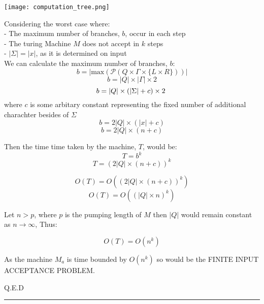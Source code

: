 \documentclass[a4page]{exam}
\begin{document}
\begin{questions}
\begin{solution}
    \texttt{[image: computation\_tree.png]}


    Considering the worst case where:\\
    - The maximum number of branches, $b$, occur in each step\\
    - The turing Machine $M$ does not accept in $k$ steps\\
    - $|\Sigma | = |x|$, as it is determined on input\\

    We can calculate the maximum number of branches, $b$:
    $$ b = |\text{max} \left( \mathcal{P}(Q \times \Gamma \times \{L\times R\}) \right) | $$
    $$ b = |Q| \times |\Gamma| \times 2 $$
    $$ b = |Q| \times (|\Sigma| + c) \times 2 \hspace{1mm} $$
    where $c$ is some arbitary constant representing the fixed number of additional charachter besides of $\Sigma$ 
    $$ b = 2 |Q| \times (|x| + c)$$
    $$ b = 2 |Q| \times (n + c)$$

    Then the time time taken by the machine, $T$, would be:
    $$ T = b^k $$
    $$ T = (2 |Q| \times (n + c))^k$$

    $$ O(T) = O((2 |Q| \times (n + c))^k)$$
    $$ O(T) = O(( |Q| \times n)^k)$$

    Let $n > p$, where $p$ is the pumping length of $M$ then $|Q|$ would remain constant as $n \to \infty$,
    Thus:

    $$ O(T) = O(n^k)$$

    As the machine $M_a$ is time bounded by $O(n^k)$ so would be  the FINITE INPUT ACCEPTANCE PROBLEM.

    Q.E.D
  \end{solution}
  
\end{questions}

\noindent\rule{\textwidth}{1pt}
\end{document}
